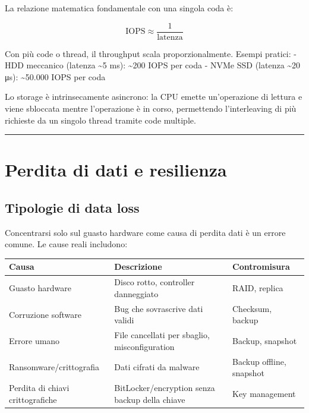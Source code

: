 \documentclass[
  italian,
  openany]{book}
\newcounter{none} %
\begin{document}
La relazione matematica fondamentale con una singola coda è:

\[\text{IOPS} \approx \frac{1}{\text{latenza}}\]

Con più code o thread, il throughput scala proporzionalmente. Esempi
pratici: - HDD meccanico (latenza \textasciitilde5 ms):
\textasciitilde200 IOPS per coda - NVMe SSD (latenza \textasciitilde20
μs): \textasciitilde50.000 IOPS per coda

Lo storage è intrinsecamente asincrono: la CPU emette un'operazione di
lettura e viene sbloccata mentre l'operazione è in corso, permettendo
l'interleaving di più richieste da un singolo thread tramite code
multiple.

\begin{center}\rule{0.5\linewidth}{0.5pt}\end{center}

\section{Perdita di dati e
resilienza}\label{perdita-di-dati-e-resilienza}

\subsection{Tipologie di data loss}\label{tipologie-di-data-loss}

Concentrarsi solo sul guasto hardware come causa di perdita dati è un
errore comune. Le cause reali includono:

{\def\LTcaptype{none} %
\begin{longtable}[]{@{}
  >{\raggedright\arraybackslash}p{}
  >{\raggedright\arraybackslash}p{}
  >{\raggedright\arraybackslash}p{}@{}}
\toprule\noalign{}
\begin{minipage}[b]{\linewidth}\raggedright
Causa
\end{minipage} & \begin{minipage}[b]{\linewidth}\raggedright
Descrizione
\end{minipage} & \begin{minipage}[b]{\linewidth}\raggedright
Contromisura
\end{minipage} \\
\midrule\noalign{}
\endhead
\bottomrule\noalign{}
\endlastfoot
Guasto hardware & Disco rotto, controller danneggiato & RAID, replica \\
Corruzione software & Bug che sovrascrive dati validi & Checksum,
backup \\
Errore umano & File cancellati per sbaglio, misconfiguration & Backup,
snapshot \\
Ransomware/crittografia & Dati cifrati da malware & Backup offline,
snapshot \\
Perdita di chiavi crittografiche & BitLocker/encryption senza backup
della chiave & Key management \\
\end{longtable}
}
\end{document}
